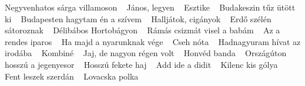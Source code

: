 \footnotesize Negyvenhatos sárga villamoson \ \textbf{\pageref{hatossC3A1rgavillamoson}} \newline
\footnotesize János, legyen \ \textbf{\pageref{nos2Clegyen}} \newline
\footnotesize Esztike \ \textbf{\pageref{}} \newline
\footnotesize Budakeszin tűz ütött ki \ \textbf{\pageref{zintC5B1zC3BCtC3B6ttki}} \newline
\footnotesize Budapesten hagytam én a szívem \ \textbf{\pageref{tenhagytamC3A9naszC3ADvem}} \newline
\footnotesize Halljátok, cigányok \ \textbf{\pageref{3A1tok2CcigC3A1nyok}} \newline
\footnotesize Erdő szélén sátoroznak \ \textbf{\pageref{91szC3A9lC3A9nsC3A1toroznak}} \newline
\footnotesize Délibábos Hortobágyon \ \textbf{\pageref{libC3A1bosHortobC3A1gyon}} \newline
\footnotesize Rámás csizmát visel a babám \ \textbf{\pageref{mC3A1scsizmC3A1tviselababC3A1m}} \newline
\footnotesize Az a rendes iparos \ \textbf{\pageref{ndesiparos}} \newline
\footnotesize Ha majd a nyarunknak vége \ \textbf{\pageref{anyarunknakvC3A9ge}} \newline
\footnotesize Cseh nóta \ \textbf{\pageref{C3B3ta}} \newline
\footnotesize Hadnagyuram hívat az irodába \ \textbf{\pageref{uramhC3ADvatazirodC3A1ba}} \newline
\footnotesize Kombiné \ \textbf{\pageref{C3A9}} \newline
\footnotesize Jaj, de nagyon régen volt \ \textbf{\pageref{nagyonrC3A9genvolt}} \newline
\footnotesize Honvéd banda \ \textbf{\pageref{A9dbanda}} \newline
\footnotesize Országúton hosszú a jegenyesor \ \textbf{\pageref{A1gC3BAtonhosszC3BAajegenyesor}} \newline
\footnotesize Hosszú fekete haj \ \textbf{\pageref{3BAfeketehaj}} \newline
\footnotesize Add ide a didit \ \textbf{\pageref{adidit}} \newline
\footnotesize Kilenc kis gólya \ \textbf{\pageref{kisgC3B3lya}} \newline
\footnotesize Fent leszek szerdán \ \textbf{\pageref{szekszerdC3A1n}} \newline
\footnotesize Lovacska polka \ \textbf{\pageref{apolka}} \newline
